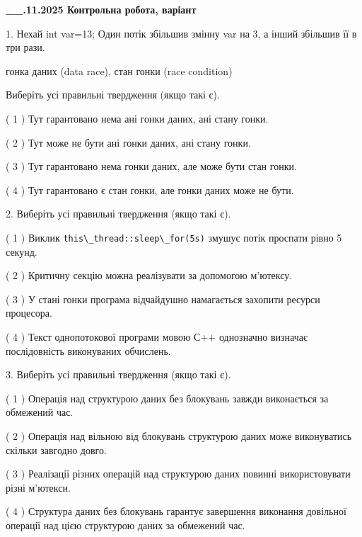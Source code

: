 \documentclass[12pt, ukrainian]{article}
\def\code#1{\Verb!#1!}
\begin{document}
\newpage
\begin {large}

\textbf{\_\_.11.2025 Контрольна робота, варіант  }\par


{
1. Нехай int var=13; Один потік збільшив змінну var на 3, а інший збільшив її в три рази.

гонка даних (data race), стан гонки (race condition)

Виберіть усі правильні твердження (якщо такі є).\par
\vspace{2mm}
( 1 ) Тут гарантовано нема ані гонки даних, ані стану гонки.%

( 2 ) Тут може не бути ані гонки даних, ані стану гонки.%

( 3 ) Тут гарантовано нема гонки даних, але може бути стан гонки.%

( 4 ) Тут гарантовано є стан гонки, але гонки даних може не бути.%


2. Виберіть усі правильні твердження (якщо такі є).\par
\vspace{2mm}

( 1 ) Виклик \code{this\_thread::sleep\_for(5s)} змушує потік проспати рівно 5 секунд.%

( 2 ) Критичну секцію можна реалізувати за допомогою м’ютексу.%

( 3 ) У стані гонки програма відчайдушно намагається захопити ресурси процесора.%

( 4 ) Текст однопотокової програми мовою С++ однозначно визначає послідовність виконуваних обчислень.%


3. Виберіть усі правильні твердження (якщо такі є).\par
\vspace{2mm}

( 1 ) Операція над структурою даних без блокувань завжди виконається за обмежений час.%

( 2 ) Операція над вільною від блокувань структурою даних може виконуватись скільки завгодно довго.%

( 3 ) Реалізації різних операцій над структурою даних повинні використовувати різні м’ютекси.%

( 4 ) Структура даних без блокувань гарантує завершення виконання довільної операції над цією структурою даних за обмежений час.%


}
\end{large}
\end{document}
